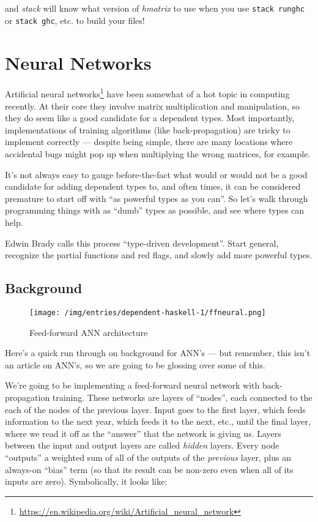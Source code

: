 \documentclass[]{article}
\renewcommand{\href}[2]{#2\footnote{\url{#1}}}
\begin{document}
and \emph{stack} will know what version of \emph{hmatrix} to use when
you use \texttt{stack\ runghc} or \texttt{stack\ ghc}, etc. to build
your files!

\section{Neural Networks}\label{neural-networks}

\href{https://en.wikipedia.org/wiki/Artificial_neural_network}{Artificial
neural networks} have been somewhat of a hot topic in computing
recently. At their core they involve matrix multiplication and
manipulation, so they do seem like a good candidate for a dependent
types. Most importantly, implementations of training algorithms (like
back-propagation) are tricky to implement correctly --- despite being
simple, there are many locations where accidental bugs might pop up when
multiplying the wrong matrices, for example.

It's not always easy to gauge before-the-fact what would or would not be
a good candidate for adding dependent types to, and often times, it can
be considered premature to start off with ``as powerful types as you
can''. So let's walk through programming things with as ``dumb'' types
as possible, and see where types can help.

Edwin Brady calls this process ``type-driven development''. Start
general, recognize the partial functions and red flags, and slowly add
more powerful types.

\subsection{Background}\label{background}

\begin{figure}[htbp]
\centering
\texttt{[image: /img/entries/dependent-haskell-1/ffneural.png]}
\caption{Feed-forward ANN architecture}
\end{figure}

Here's a quick run through on background for ANN's --- but remember,
this isn't an article on ANN's, so we are going to be glossing over some
of this.

We're going to be implementing a feed-forward neural network with
back-propagation training. These networks are layers of ``nodes'', each
connected to the each of the nodes of the previous layer. Input goes to
the first layer, which feeds information to the next year, which feeds
it to the next, etc., until the final layer, where we read it off as the
``answer'' that the network is giving us. Layers between the input and
output layers are called \emph{hidden} layers. Every node ``outputs'' a
weighted sum of all of the outputs of the \emph{previous} layer, plus an
always-on ``bias'' term (so that its result can be non-zero even when
all of its inputs are zero). Symbolically, it looks like:
\end{document}
